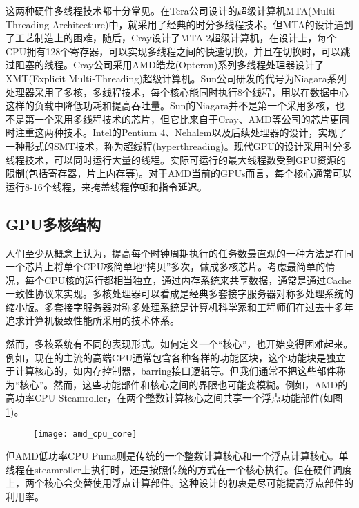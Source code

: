 这两种硬件多线程技术都十分常见。在Tera公司设计的超级计算机MTA(Multi-Threading Architecture)中，就采用了经典的时分多线程技术。但MTA的设计遇到了工艺制造上的困难，随后，Cray设计了MTA-2超级计算机，在设计上，每个CPU拥有128个寄存器，可以实现多线程之间的快速切换，并且在切换时，可以跳过阻塞的线程。Cray公司采用AMD皓龙(Opteron)系列多线程处理器设计了XMT(Explicit Multi-Threading)超级计算机。Sun公司研发的代号为Niagara系列处理器采用了多核，多线程技术，每个核心能同时执行8个线程，用以在数据中心这样的负载中降低功耗和提高吞吐量。Sun的Niagara并不是第一个采用多核，也不是第一个采用多线程技术的芯片，但它比来自于Cray、AMD等公司的芯片更同时注重这两种技术。Intel的Pentium 4、Nehalem以及后续处理器的设计，实现了一种形式的SMT技术，称为超线程(hyperthreading)。现代GPU的设计采用时分多线程技术，可以同时运行大量的线程。实际可运行的最大线程数受到GPU资源的限制(包括寄存器，片上内存等)。对于AMD当前的GPUs而言，每个核心通常可以运行8-16个线程，来掩盖线程停顿和指令延迟。

\subsection{GPU多核结构}
人们至少从概念上认为，提高每个时钟周期执行的任务数最直观的一种方法是在同一个芯片上将单个CPU核简单地“拷贝”多次，做成多核芯片。考虑最简单的情况，每个CPU核的运行都相当独立，通过内存系统来共享数据，通常是通过Cache一致性协议来实现。多核处理器可以看成是经典多套接字服务器对称多处理系统的缩小版。多套接字服务器对称多处理系统是计算机科学家和工程师们在过去十多年追求计算机极致性能所采用的技术体系。

然而，多核系统有不同的表现形式。如何定义一个“核心”，也开始变得困难起来。例如，现在的主流的高端CPU通常包含各种各样的功能区块，这个功能块是独立于计算核心的，如内存控制器，barring接口逻辑等。但我们通常不把这些部件称为“核心”。然而，这些功能部件和核心之间的界限也可能变模糊。例如，AMD的高功率CPU Steamroller，在两个整数计算核心之间共享一个浮点功能部件(如图\ref{fig:amd_cpu_core})。
\begin{figure}[htbp]
	\centering
	\texttt{[image: amd\_cpu\_core]}
	\label{fig:amd_cpu_core}
\end{figure}

但AMD低功率CPU Puma则是传统的一个整数计算核心和一个浮点计算核心。单线程在steamroller上执行时，还是按照传统的方式在一个核心执行。但在硬件调度上，两个核心会交替使用浮点计算部件。这种设计的初衷是尽可能提高浮点部件的利用率。

